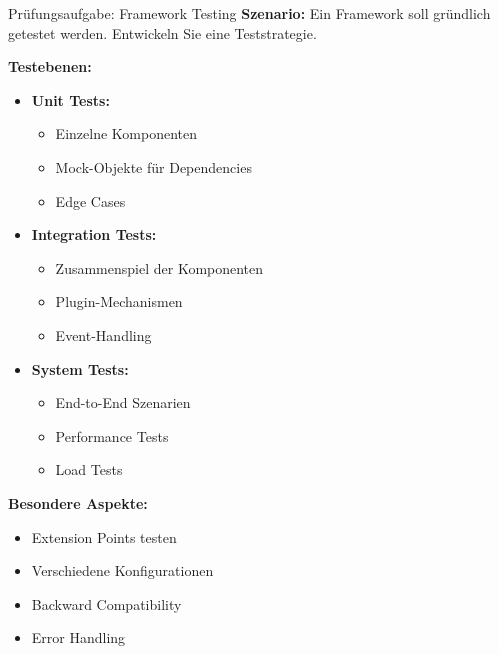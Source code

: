 \begin{example2}{Prüfungsaufgabe: Framework Testing}
\textbf{Szenario:}
Ein Framework soll gründlich getestet werden. Entwickeln Sie eine Teststrategie.

\textbf{Testebenen:}
\begin{itemize}
    \item \textbf{Unit Tests:}
    \begin{itemize}
        \item Einzelne Komponenten
        \item Mock-Objekte für Dependencies
        \item Edge Cases
    \end{itemize}
    
    \item \textbf{Integration Tests:}
    \begin{itemize}
        \item Zusammenspiel der Komponenten
        \item Plugin-Mechanismen
        \item Event-Handling
    \end{itemize}
    
    \item \textbf{System Tests:}
    \begin{itemize}
        \item End-to-End Szenarien
        \item Performance Tests 
        \item Load Tests
    \end{itemize}
\end{itemize}

\textbf{Besondere Aspekte:}
\begin{itemize}
    \item Extension Points testen
    \item Verschiedene Konfigurationen
    \item Backward Compatibility
    \item Error Handling
\end{itemize}
\end{example2}